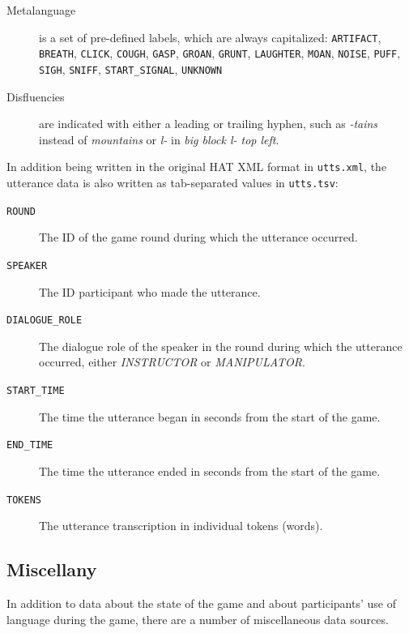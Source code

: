 \documentclass[USenglish]{article}
\newcommand{\lingform}[1]{\emph{#1}}
\newcommand{\inlinecode}[1]{\texttt{#1}}	%
\begin{document}
\begin{description}
	\item [Metalanguage] is a set of pre-defined labels, which are always capitalized: \inlinecode{ARTIFACT}, \inlinecode{BREATH}, \inlinecode{CLICK}, \inlinecode{COUGH}, \inlinecode{GASP},	\inlinecode{GROAN}, \inlinecode{GRUNT}, \inlinecode{LAUGHTER}, \inlinecode{MOAN}, \inlinecode{NOISE}, \inlinecode{PUFF}, \inlinecode{SIGH}, \inlinecode{SNIFF}, \inlinecode{START\_SIGNAL}, \inlinecode{UNKNOWN}
	\item [Disfluencies] are indicated with either a leading or trailing hyphen, such as \lingform{-tains} instead of \lingform{mountains} or \lingform{l-} in \lingform{big block l- top left}.
\end{description}

In addition being written in the original HAT XML format in \inlinecode{utts.xml}, the utterance data is also written as tab-separated values in \inlinecode{utts.tsv}:

\begin{description}
	\item[\inlinecode{ROUND}] The ID of the game round during which the utterance occurred.
	\item[\inlinecode{SPEAKER}] The ID participant who made the utterance.
	\item[\inlinecode{DIALOGUE\_ROLE}] The dialogue role of the speaker in the round during which the utterance occurred, either \lingform{INSTRUCTOR} or \lingform{MANIPULATOR}.
	\item[\inlinecode{START\_TIME}] The time the utterance began in seconds from the start of the game.
	\item[\inlinecode{END\_TIME}] The time the utterance ended in seconds from the start of the game.
	\item[\inlinecode{TOKENS}] The utterance transcription in individual tokens (words).
\end{description}

\subsection{Miscellany}

In addition to data about the state of the game and about participants' use of language during the game, there are a number of miscellaneous data sources.
\end{document}
